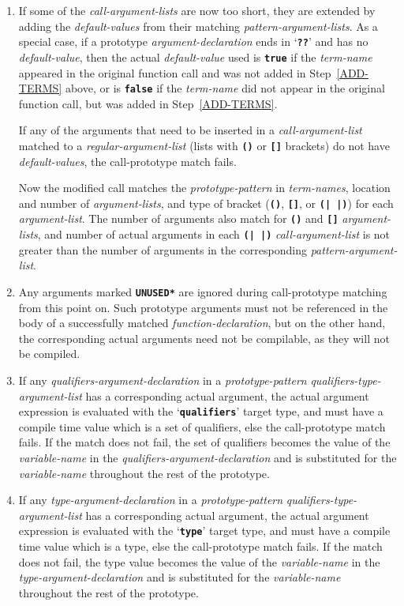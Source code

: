 \documentclass[12pt]{article}
\newcommand{\TT}[1]{{\tt \bfseries #1}}
\begin{document}
\begin{enumerate}
\item
If some of the {\em call-argument-lists} are now too short, they are extended
by adding the {\em default-values} from
their matching {\em pattern-argument-lists}.
As a special case, if a prototype {\em arg\-u\-ment-de\-clar\-a\-tion} ends in
`\TT{??}' and has no {\em default-value}, then the actual
{\em default-value} used is \TT{true} if the {\em term-name}
appeared in the original function call and was not added in
Step~\ref{ADD-TERMS} above, or is \TT{false} if the {\em term-name}
did not appear in the original function call, but was added in
Step~\ref{ADD-TERMS}.

If any of the arguments that need to be inserted in a
{\em call-argument-list} matched to a {\em regular-argument-list}
(lists with \TT{()} or \TT{[]} brackets)
do not have {\em default-values}, the call-prototype match fails.

Now the modified call matches
the {\em prototype-pattern} in {\em term-names},
location and number of {\em argument-lists}, and type of bracket (\TT{()},
\TT{[]}, or \TT{(|~|)}) for each {\em argument-list}.  The number of
arguments also match for \TT{()} and \TT{[]} {\em argument-lists},
and number of actual arguments in each \TT{(|~|)} {\em call-argument-list}
is not greater than the number of arguments in the corresponding
{\em pattern-argument-list}.

\item
Any arguments marked \TT{*UNUSED*} are ignored during call-prototype
matching from this point on.  Such prototype arguments must not be referenced
in the body of a successfully matched {\em function-declaration},
but on the other hand, the corresponding actual arguments
need not be compilable, as they will not be compiled.

\item
If any {\em qualifiers-argument-declaration} in a {\em prototype-pattern}
{\em qualifiers-type-argument-list} has a corresponding
actual argument, the actual argument expression
is evaluated with the `\TT{qualifiers}' target type,
and must have a compile time value which is a set of qualifiers, else
the call-prototype match fails.  If the match does not fail,
the set of qualifiers becomes the value of the {\em variable-name}
in the {\em qualifiers-argument-declaration} and
is substituted for the {\em variable-name} throughout the rest of the
prototype.

\item
If any {\em type-argument-declaration} in a {\em prototype-pattern}
{\em qualifiers-type-argument-list} has a corresponding
actual argument, the actual argument expression
is evaluated with the `\TT{type}' target type,
and must have a compile time value which is a type, else
the call-prototype match fails.  If the match does not fail,
the type value becomes the value of the {\em variable-name}
in the {\em type-argument-declaration} and
is substituted for the {\em variable-name} throughout the rest of the
prototype.


\end{enumerate}
\end{document}
